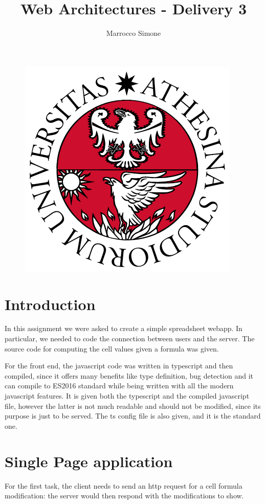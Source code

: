 \documentclass[12pt, a4paper]{article}
\title{Web Architectures - Delivery 3}
\author{Marrocco Simone}
\begin{document}
  \maketitle
  \begin{figure}[H]
    \centering
    \includegraphics[scale=0.35]{unitn.png}
  \end{figure}
  \tableofcontents
  \pagebreak

  \section{Introduction}
  In this assignment we were asked to create a simple spreadsheet webapp. In particular, we needed to code the connection between users and the server. The source code for computing the cell values given a formula was given.

  For the front end, the javascript code was written in typescript and then compiled, since it offers many benefits like type definition, bug detection and it can compile to ES2016 standard while being written with all the modern javascript features. It is given both the typescript and the compiled javascript file, however the latter is not much readable and should not be modified, since its purpose is just to be served. The ts config file is also given, and it is the standard one.

  \section{Single Page application}
  For the first task, the client needs to send an http request for a cell formula modification: the server would then respond with the modifications to show.
\end{document}
